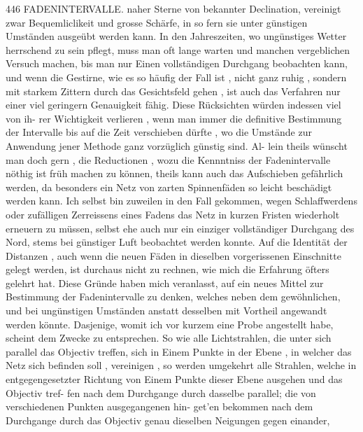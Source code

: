 \documentclass[10pt,a4paper]{article}
\begin{document}
446  FADENINTERVALLE.
naher  Sterne  von  bekannter  Declination,  vereinigt  zwar  Bequemliclikeit  und  grosse  Schärfe,  in  so  fern
sie  unter  günstigen  Umständen  ausgeübt  werden  kann.  In  den  Jahreszeiten,  wo  ungünstiges  Wetter
herrschend  zu  sein  pflegt,  muss  man  oft  lange  warten  und  manchen  vergeblichen  Versuch  machen,  bis
man  nur  Einen  vollständigen  Durchgang  beobachten  kann,  und  wenn  die  Gestirne,  wie  es  so  häufig  der
Fall  ist ,  nicht  ganz  ruhig ,  sondern  mit  starkem  Zittern  durch  das  Gesichtsfeld  gehen ,  ist  auch  das
Verfahren  nur  einer  viel  geringern  Genauigkeit  fähig.  Diese  Rücksichten  würden  indessen  viel  von  ih-
rer Wichtigkeit  verlieren ,  wenn  man  immer  die  definitive  Bestimmung  der  Intervalle  bis  auf  die  Zeit
verschieben  dürfte ,  wo  die  Umstände  zur  Anwendung  jener  Methode  ganz  vorzüglich  günstig  sind.  Al-
lein theils  wünscht  man  doch  gern ,  die  Reductionen ,  wozu  die  Kennntniss  der  Fadenintervalle  nöthig
ist  früh  machen  zu  können,  theils  kann  auch  das  Aufschieben  gefährlich  werden,  da  besonders  ein
Netz  von  zarten  Spinnenfäden  so  leicht  beschädigt  werden  kann.  Ich  selbst  bin  zuweilen  in  den  Fall
gekommen,  wegen  Schlaffwerdens  oder  zufälligen  Zerreissens  eines  Fadens  das  Netz  in  kurzen  Fristen
wiederholt  erneuern  zu  müssen,  selbst  ehe  auch  nur  ein  einziger  vollständiger  Durchgang  des  Nord,
stems  bei  günstiger  Luft  beobachtet  werden  konnte.  Auf  die  Identität  der  Distanzen ,  auch  wenn  die
neuen  Fäden  in  dieselben  vorgerissenen  Einschnitte  gelegt  werden,  ist  durchaus  nicht  zu  rechnen,  wie
mich  die  Erfahrung  öfters  gelehrt  hat.  Diese  Gründe  haben  mich  veranlasst,  auf  ein  neues  Mittel  zur
Bestimmung  der  Fadenintervalle  zu  denken,  welches  neben  dem  gewöhnlichen,  und  bei  ungünstigen
Umständen  anstatt  desselben  mit  Vortheil  angewandt  werden  könnte.  Dasjenige,  womit  ich  vor  kurzem
eine  Probe  angestellt  habe,  scheint  dem  Zwecke  zu  entsprechen.
So  wie  alle  Lichtstrahlen,  die  unter  sich  parallel  das  Objectiv  treffen,  sich  in  Einem  Punkte  in
der  Ebene ,  in  welcher  das  Netz  sich  befinden  soll ,  vereinigen ,  so  werden  umgekehrt  alle  Strahlen,
welche  in  entgegengesetzter  Richtung  von  Einem  Punkte  dieser  Ebene  ausgehen  und  das  Objectiv  tref-
fen nach  dem  Durchgange  durch  dasselbe  parallel;  die  von  verschiedenen  Punkten  ausgegangenen  hin-
get'en  bekommen  nach  dem  Durchgange  durch  das  Objectiv  genau  dieselben  Neigungen  gegen  einander,
\end{document}
